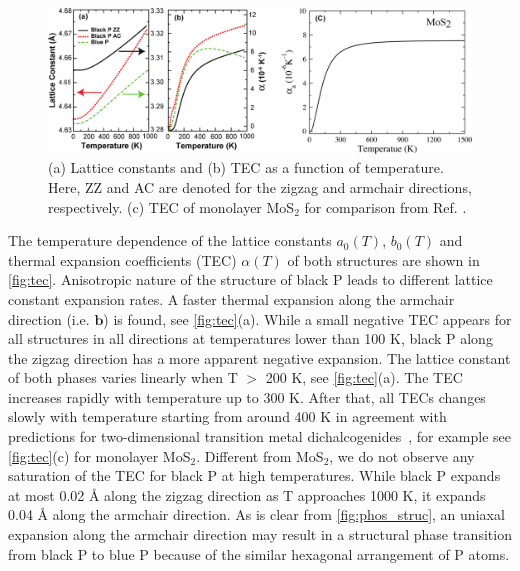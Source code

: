 \begin{figure}[htbp]
\centering
\includegraphics[width=\linewidth]{expan_T.eps}%
\caption{(a) Lattice constants and (b) TEC as a function of temperature.  Here, ZZ and AC are denoted for the zigzag and armchair directions, respectively. (c) TEC of monolayer MoS$_2$ for comparison from Ref. \cite{QHA3}.\label{fig:tec}}
\end{figure}

The temperature dependence of the lattice constants $a_0(T)$, $b_0(T)$ and thermal expansion coefficients (TEC) $\alpha(T)$ of both structures are shown in \autoref{fig:tec}. Anisotropic nature of the structure of black P leads to different lattice constant expansion rates. A faster thermal expansion along the armchair direction (i.e. $\mathbf{b}$) is found, see \autoref{fig:tec}(a). While a small negative TEC appears for all structures in all directions at temperatures lower than 100 K, black P along the zigzag direction has a more apparent negative expansion.  The lattice constant of both phases varies linearly when T $>$ 200 K, see \autoref{fig:tec}(a). The TEC increases rapidly with temperature  up to 300 K.  After that, all TECs changes slowly with temperature starting from around 400 K in agreement with predictions for two-dimensional transition metal dichalcogenides~\cite{QHA2,QHA3}, for example see \autoref{fig:tec}(c) for monolayer MoS$_2$.
Different from MoS$_2$, we do not observe any saturation of the TEC for black P at high temperatures.  While black P expands at most 0.02 {\AA} along the zigzag direction as T approaches 1000 K, it expands 0.04 {\AA} along the armchair direction. As is clear from \autoref{fig:phos_struc}, an uniaxal expansion along the armchair direction may result in a structural phase transition from black P to blue P because of the similar hexagonal arrangement of P atoms\cite{negative-pos}. 

